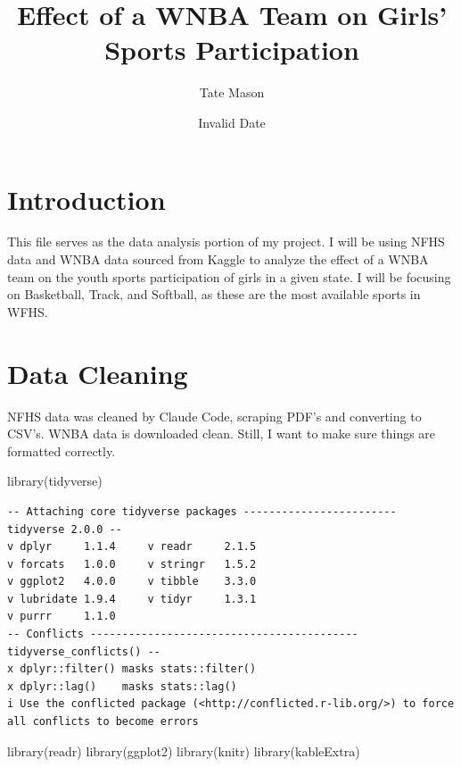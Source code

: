 \documentclass[
  letterpaper,
  DIV=11,
  numbers=noendperiod]{scrartcl}
\title{Effect of a WNBA Team on Girls' Sports Participation}
\author{Tate Mason}
\date{Invalid Date}
\newenvironment{Shaded}{\begin{snugshade}}{\end{snugshade}}
\newcommand{\FunctionTok}[1]{\textcolor[rgb]{0.28,0.35,0.67}{#1}}
\newcommand{\NormalTok}[1]{\textcolor[rgb]{0.00,0.23,0.31}{#1}}
\begin{document}
\maketitle


\section{Introduction}\label{introduction}

This file serves as the data analysis portion of my project. I will be
using NFHS data and WNBA data sourced from Kaggle to analyze the effect
of a WNBA team on the youth sports participation of girls in a given
state. I will be focusing on Basketball, Track, and Softball, as these
are the most available sports in\\
WFHS.

\section{Data Cleaning}\label{data-cleaning}

NFHS data was cleaned by Claude Code, scraping PDF's and converting to
CSV's. WNBA data is downloaded clean. Still, I want to make sure things
are formatted correctly.

\begin{Shaded}
\begin{Highlighting}[]
\FunctionTok{library}\NormalTok{(tidyverse)}
\end{Highlighting}
\end{Shaded}

\begin{verbatim}
-- Attaching core tidyverse packages ------------------------ tidyverse 2.0.0 --
v dplyr     1.1.4     v readr     2.1.5
v forcats   1.0.0     v stringr   1.5.2
v ggplot2   4.0.0     v tibble    3.3.0
v lubridate 1.9.4     v tidyr     1.3.1
v purrr     1.1.0     
-- Conflicts ------------------------------------------ tidyverse_conflicts() --
x dplyr::filter() masks stats::filter()
x dplyr::lag()    masks stats::lag()
i Use the conflicted package (<http://conflicted.r-lib.org/>) to force all conflicts to become errors
\end{verbatim}

\begin{Shaded}
\begin{Highlighting}[]
\FunctionTok{library}\NormalTok{(readr)}
\FunctionTok{library}\NormalTok{(ggplot2)}
\FunctionTok{library}\NormalTok{(knitr)}
\FunctionTok{library}\NormalTok{(kableExtra)}
\end{Highlighting}
\end{Shaded}
\end{document}
